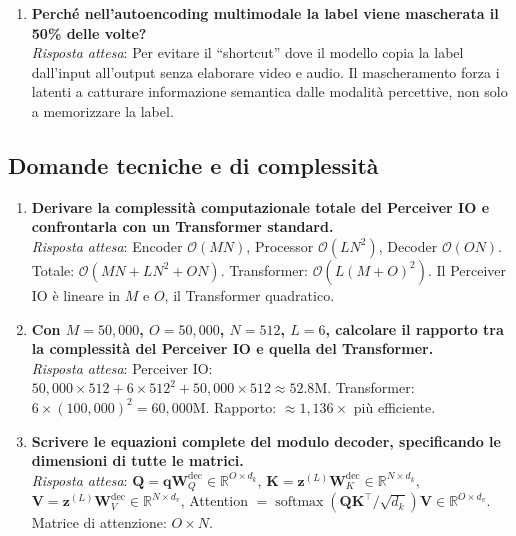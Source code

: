 \documentclass[12pt,a4paper]{article}
\begin{document}
\begin{enumerate}[label=\textbf{Q\arabic*.}]
    \item \textbf{Perch\'e nell'autoencoding multimodale la label viene mascherata il 50\% delle volte?}\\
    \textit{Risposta attesa}: Per evitare il ``shortcut'' dove il modello copia la label dall'input all'output senza elaborare video e audio. Il mascheramento forza i latenti a catturare informazione semantica dalle modalit\`a percettive, non solo a memorizzare la label.
\end{enumerate}

\subsection{Domande tecniche e di complessit\`a}

\begin{enumerate}[label=\textbf{Q\arabic*.}, resume]
    \item \textbf{Derivare la complessit\`a computazionale totale del Perceiver IO e confrontarla con un Transformer standard.}\\
    \textit{Risposta attesa}: Encoder $\mathcal{O}(MN)$, Processor $\mathcal{O}(LN^2)$, Decoder $\mathcal{O}(ON)$. Totale: $\mathcal{O}(MN + LN^2 + ON)$. Transformer: $\mathcal{O}(L(M+O)^2)$. Il Perceiver IO \`e lineare in $M$ e $O$, il Transformer quadratico.

    \item \textbf{Con $M = 50{,}000$, $O = 50{,}000$, $N = 512$, $L = 6$, calcolare il rapporto tra la complessit\`a del Perceiver IO e quella del Transformer.}\\
    \textit{Risposta attesa}: Perceiver IO: $50{,}000 \times 512 + 6 \times 512^2 + 50{,}000 \times 512 \approx 52.8\text{M}$. Transformer: $6 \times (100{,}000)^2 = 60{,}000\text{M}$. Rapporto: $\approx 1{,}136\times$ pi\`u efficiente.

    \item \textbf{Scrivere le equazioni complete del modulo decoder, specificando le dimensioni di tutte le matrici.}\\
    \textit{Risposta attesa}: $\mathbf{Q} = \mathbf{q}\mathbf{W}_Q^{\text{dec}} \in \mathbb{R}^{O \times d_k}$, $\mathbf{K} = \mathbf{z}^{(L)}\mathbf{W}_K^{\text{dec}} \in \mathbb{R}^{N \times d_k}$, $\mathbf{V} = \mathbf{z}^{(L)}\mathbf{W}_V^{\text{dec}} \in \mathbb{R}^{N \times d_v}$, Attention $= \operatorname{softmax}(\mathbf{QK}^\top/\sqrt{d_k})\mathbf{V} \in \mathbb{R}^{O \times d_v}$. Matrice di attenzione: $O \times N$.


\end{enumerate}
\end{document}
